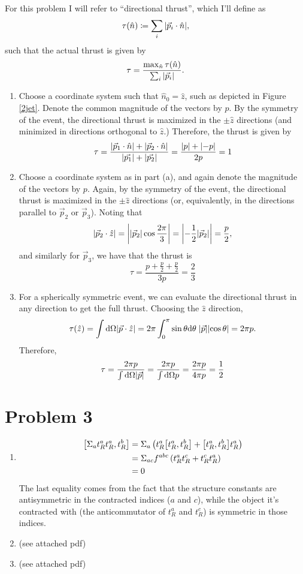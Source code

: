 \documentclass[12pt]{article}
\begin{document}
For this problem I will refer to ``directional thrust'', which I'll define as
\[ \tau(\hat{n}) \coloneqq \sum_i \abs{\vec{p}_i \cdot \hat{n}}, \]
such that the actual thrust is given by 
\[ \tau = \frac{\max_{\hat{n}}\tau(\hat{n})}{\sum_i \abs{\vec{p}_i}}. \]

\begin{enumerate}[label=(\alph*)]
    \item
    Choose a coordinate system such that $\hat{n}_0 = \hat{z}$, such as depicted in Figure \ref{2jet}. Denote the common magnitude of the vectors by $p$. By the symmetry of the event, the directional thrust is maximized in the $\pm\hat{z}$ directions (and minimized in directions orthogonal to $\hat{z}$.) Therefore, the thrust is given by
    \[ \tau = \frac{\abs{\vec{p}_1\cdot\hat{n}} + \abs{\vec{p}_2\cdot\hat{n}}}{\abs{\vec{p_1}} + \abs{\vec{p_2}}} = \frac{\abs{p} + \abs{-p}}{2p} = 1  \] 

    \item
    Choose a coordinate system as in part (a), and again denote the magnitude of the vectors by $p$. Again, by the symmetry of the event, the directional thrust is maximized in the $\pm \hat{z}$ directions (or, equivalently, in the directions parallel to $\vec{p}_2$ or $\vec{p}_3$). Noting that 
    \[ \abs{\vec{p}_2\cdot\hat{z}} = \abs{\abs{\vec{p}_2}\cos\frac{2\pi}{3}} = \abs{-\frac{1}{2}\abs{\vec{p}_2}} = \frac{p}{2}, \]
    and similarly for $\vec{p}_3$, we have that the thrust is
    \[ \tau = \frac{p + \frac{p}{2} + \frac{p}{2}}{3p} = \frac{2}{3} \]

    \item
    For a spherically symmetric event, we can evaluate the directional thrust in any direction to get the full thrust. Choosing the $\hat{z}$ direction,
    \[ \tau(\hat{z}) = \int \dd\Omega \abs{\vec{p}\cdot\hat{z}} = 2\pi\int_0^\pi\sin\theta\dd\theta\;\abs{\vec{p}}\abs{\cos\theta} = 2\pi p. \]
    Therefore,
    \[ \tau = \frac{2\pi p}{\int\dd\Omega\abs{\vec{p}}} = \frac{2\pi p}{\int\dd\Omega p} = \frac{2\pi p}{4\pi p} = \frac{1}{2} \]
\end{enumerate}


\section*{Problem 3}
\begin{enumerate}[label=(\alph*)]
    \item 
    \begin{align*}
        \comm{\Sigma_at_R^at_R^a}{t_R^b} &= \Sigma_a\left(t_R^a\comm{t_R^a}{t_R^b} + \comm{t_R^a}{t_R^b}t_R^a\right) \\
        &= \Sigma_{ac}f^{abc}\left(t_R^at_R^c + t_R^ct_R^a\right) \\
        &= 0
    \end{align*}
    The last equality comes from the fact that the structure constants are antisymmetric in the contracted indices ($a$ and $c$), while the object it's contracted with (the anticommutator of $t_R^a$ and $t_R^c$) is symmetric in those indices.
    \item (see attached pdf)
    \item (see attached pdf)
\end{enumerate}

\end{document}
